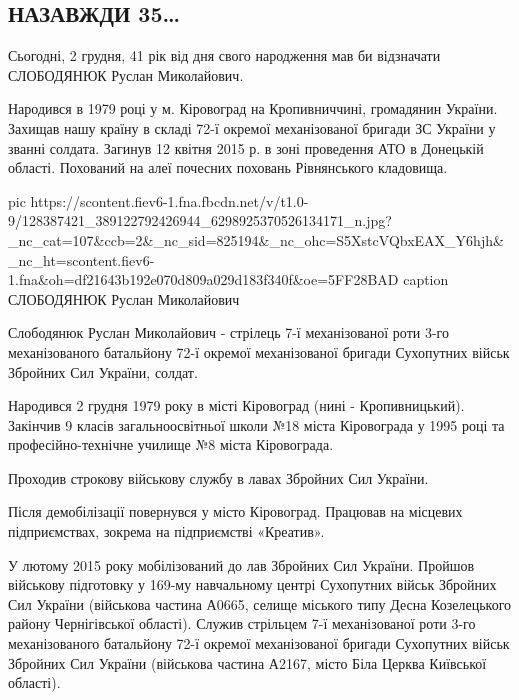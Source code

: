  
 
 
 
 

\subsection{НАЗАВЖДИ 35…}

Сьогодні, 2 грудня, 41 рік від дня свого народження мав би відзначати СЛОБОДЯНЮК Руслан Миколайович.


Народився в 1979 році у м. Кіровоград на Кропивниччині, громадянин України.
Захищав нашу країну в складі 72-ї окремої механізованої бригади ЗС України у
званні солдата. Загинув 12 квітня 2015 р. в зоні проведення АТО в Донецькій
області. Похований на алеї почесних поховань Рівнянського кладовища.

\ifcmt
pic https://scontent.fiev6-1.fna.fbcdn.net/v/t1.0-9/128387421_389122792426944_6298925370526134171_n.jpg?_nc_cat=107&ccb=2&_nc_sid=825194&_nc_ohc=S5XstcVQbxEAX_Y6hjh&_nc_ht=scontent.fiev6-1.fna&oh=df21643b192e070d809a029d183f340f&oe=5FF28BAD
caption СЛОБОДЯНЮК Руслан Миколайович
\fi

Слободянюк Руслан Миколайович - стрілець 7-ї механізованої роти 3-го
механізованого батальйону 72-ї окремої механізованої бригади Сухопутних військ
Збройних Сил України, солдат.

Народився 2 грудня 1979 року в місті Кіровоград (нині - Кропивницький).
Закінчив 9 класів загальноосвітньої школи №18 міста Кіровограда у 1995 році та
професійно-технічне училище №8 міста Кіровограда.

Проходив строкову військову службу в лавах Збройних Сил України.

Після демобілізації повернувся у місто Кіровоград. Працював на місцевих
підприємствах, зокрема на підприємстві «Креатив».

У лютому 2015 року мобілізований до лав Збройних Сил України. Пройшов військову
підготовку у 169-му навчальному центрі Сухопутних військ Збройних Сил України
(військова частина А0665, селище міського типу Десна Козелецького району
Чернігівської області). Служив стрільцем 7-ї механізованої роти 3-го
механізованого батальйону 72-ї окремої механізованої бригади Сухопутних військ
Збройних Сил України (військова частина А2167, місто Біла Церква Київської
області).


